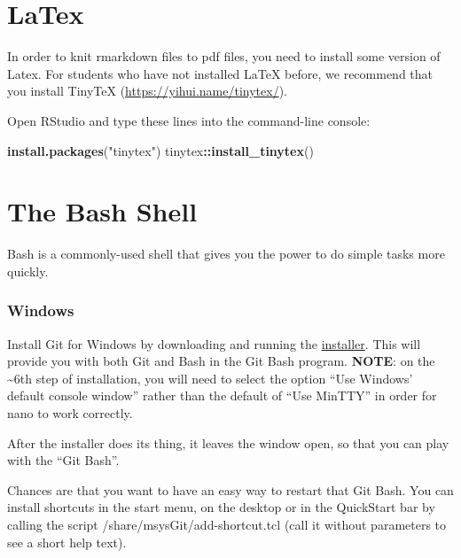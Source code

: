 \documentclass[]{book}
\newenvironment{Shaded}{\begin{snugshade}}{\end{snugshade}}
\newcommand{\KeywordTok}[1]{\textcolor[rgb]{0.13,0.29,0.53}{\textbf{#1}}}
\newcommand{\NormalTok}[1]{#1}
\newcommand{\OperatorTok}[1]{\textcolor[rgb]{0.81,0.36,0.00}{\textbf{#1}}}
\newcommand{\StringTok}[1]{\textcolor[rgb]{0.31,0.60,0.02}{#1}}
\begin{document}
\hypertarget{latex}{%
\section{LaTex}\label{latex}}

In order to knit rmarkdown files to pdf files, you need to install some version of Latex. For students who have not installed LaTeX before, we recommend that you install TinyTeX (\url{https://yihui.name/tinytex/}).

Open RStudio and type these lines into the command-line console:

\begin{Shaded}
\begin{Highlighting}[]
\KeywordTok{install.packages}\NormalTok{(}\StringTok{"tinytex"}\NormalTok{)}
\NormalTok{tinytex}\OperatorTok{::}\KeywordTok{install_tinytex}\NormalTok{() }
\end{Highlighting}
\end{Shaded}

\hypertarget{the-bash-shell}{%
\section{The Bash Shell}\label{the-bash-shell}}

Bash is a commonly-used shell that gives you the power to do simple tasks more quickly.

\hypertarget{windows}{%
\subsubsection*{Windows}\label{windows}}

Install Git for Windows by downloading and running the \href{http://msysgit.github.io/}{installer}. This will provide you with both Git and Bash in the Git Bash program. \textbf{NOTE}: on the \textasciitilde{}6th step of installation, you will need to select the option ``Use Windows' default console window'' rather than the default of ``Use MinTTY'' in order for nano to work correctly.

After the installer does its thing, it leaves the window open, so that you can play with the ``Git Bash''.

Chances are that you want to have an easy way to restart that Git Bash. You can install shortcuts in the start menu, on the desktop or in the QuickStart bar by calling the script /share/msysGit/add-shortcut.tcl (call it without parameters to see a short help text).
\end{document}
